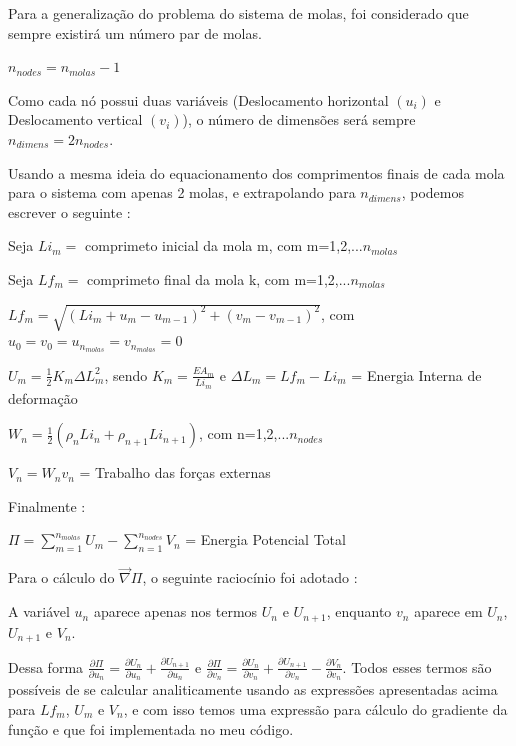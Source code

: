 \documentclass[10pt, a4paper]{article}
\begin{document}
Para a generalização do problema do sistema de molas, foi considerado que sempre existirá um número par de molas.

$n_{nodes} = n_{molas} -1$

Como cada nó possui duas variáveis (Deslocamento horizontal $(u_i)$ e Deslocamento vertical $(v_i)$), o número de dimensões
será sempre $n_{dimens} = 2n_{nodes}$.

Usando a mesma ideia do equacionamento dos comprimentos finais de cada mola para o sistema com apenas 2 molas, e
extrapolando para $n_{dimens}$, podemos escrever o seguinte :

\vspace{3mm}
Seja $Li_m = $ comprimeto inicial da mola m, com m=1,2,...$n_{molas}$

\vspace{3mm}
Seja $Lf_m = $ comprimeto final da mola k, com m=1,2,...$n_{molas}$

\vspace{3mm}
$Lf_m = \sqrt{(Li_m + u_m - u_{m-1})^2 + (v_m - v_{m-1})^2}$, com $u_0 = v_0 = u_{n_{molas}} = v_{n_{molas}} = 0 $

\vspace{3mm}
$U_m = \frac{1}{2}K_m\Delta L_m^2$, sendo $K_m = \frac{EA_m}{Li_m}$ e $\Delta L_m = Lf_m - Li_m$ = Energia Interna de deformação

\vspace{3mm}
$W_n = \frac{1}{2}(\rho_n Li_n + \rho_{n+1} Li_{n+1})$, com n=1,2,...$n_{nodes}$

\vspace{3mm}
$V_n = W_nv_n$ = Trabalho das forças externas

\vspace{3mm}
Finalmente :

\vspace{3mm}
$\Pi = \sum_{m=1}^{n_{molas}}{U_m} - \sum_{n=1}^{n_{nodes}}{V_n}$ = Energia Potencial Total

\vspace{3mm}
Para o cálculo do $\overrightarrow{\nabla} \Pi$, o seguinte raciocínio foi adotado :

A variável $u_n$ aparece apenas nos termos $U_n$ e $U_{n+1}$, enquanto $v_n$ aparece em $U_n$, $U_{n+1}$ e $V_n$.

Dessa forma $\frac{\partial \Pi}{\partial u_n} = \frac{\partial U_n}{\partial u_n} + \frac{\partial U_{n+1}}{\partial u_n}$ e 
$\frac{\partial \Pi}{\partial v_n} = \frac{\partial U_n}{\partial v_n} + \frac{\partial U_{n+1}}{\partial v_n} -
\frac{\partial V_n}{\partial v_n} $. Todos esses termos são possíveis de se calcular analiticamente usando as expressões
apresentadas acima para $Lf_m$, $U_m$ e $V_n$, e com isso temos uma expressão para cálculo do gradiente da função e que
foi implementada no meu código.
\end{document}
